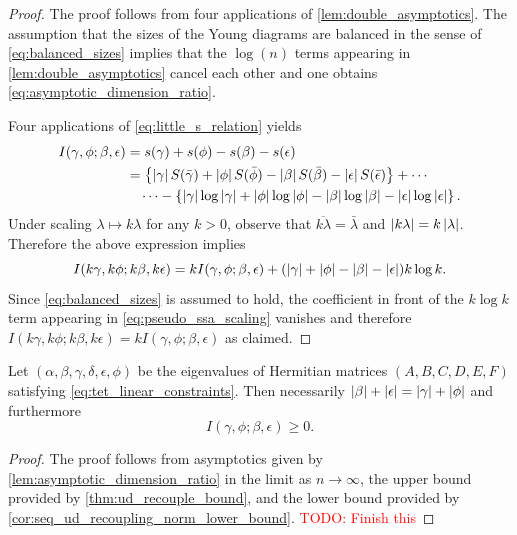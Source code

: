 \documentclass[notitlepage, 10pt]{article}
\begin{document}
\begin{proof}
    The proof follows from four applications of \cref{lem:double_asymptotics}.
    The assumption that the sizes of the Young diagrams are balanced in the sense of \cref{eq:balanced_sizes} implies that the $\log(n)$ terms appearing in \cref{lem:double_asymptotics} cancel each other and one obtains \cref{eq:asymptotic_dimension_ratio}.
    
    Four applications of \cref{eq:little_s_relation} yields
    \begin{align}
        \begin{split}
            I(\gamma,\phi;\beta,\epsilon)
            &= s(\gamma) + s(\phi) - s(\beta) - s(\epsilon) \\
            &= \left\{\left|\gamma\right|S(\bar \gamma) + \left|\phi\right| S(\bar \phi) - \left|\beta\right| S(\bar \beta) - \left|\epsilon\right| S(\bar \epsilon)\right\} + \cdots \\
            &\quad\cdots- \left\{\left|\gamma\right|\log \left|\gamma\right| + \left|\phi\right|\log \left|\phi\right| - \left|\beta\right|\log \left|\beta\right| - \left|\epsilon\right|\log \left|\epsilon\right|\right\}.
        \end{split}
    \end{align}
    Under scaling $\lambda \mapsto k \lambda$ for any $k>0$, observe that $\overline{k\lambda} = \bar \lambda$ and $\left|k\lambda\right| = k \left|\lambda\right|$.
    Therefore the above expression implies
    \begin{equation}
        \label{eq:pseudo_ssa_scaling}
        I(k\gamma,k\phi;k\beta,k\epsilon) = kI(\gamma,\phi;\beta,\epsilon) + (\left|\gamma\right|+\left|\phi\right|-\left|\beta\right|-\left|\epsilon\right|) k\log k.
    \end{equation}
    Since \cref{eq:balanced_sizes} is assumed to hold, the coefficient in front of the $k\log k$ term appearing in \cref{eq:pseudo_ssa_scaling} vanishes and therefore $I(k\gamma,k\phi;k\beta,k\epsilon) = k I(\gamma,\phi;\beta,\epsilon)$ as claimed.
\end{proof}

\begin{thm}
    Let $(\alpha,\beta,\gamma,\delta,\epsilon,\phi)$ be the eigenvalues of Hermitian matrices $(A,B,C,D,E,F)$ satisfying \cref{eq:tet_linear_constraints}.
    Then necessarily $\left|\beta\right|+\left|\epsilon\right| = \left|\gamma\right|+\left|\phi\right|$ and furthermore
    \begin{equation}
        I(\gamma, \phi; \beta, \epsilon) \geq 0.
    \end{equation} 
\end{thm}
\begin{proof}
    The proof follows from asymptotics given by \cref{lem:asymptotic_dimension_ratio} in the limit as $n \to \infty$, the upper bound provided by \cref{thm:ud_recouple_bound}, and the lower bound provided by \cref{cor:seq_ud_recoupling_norm_lower_bound}.
    \textcolor{red}{TODO: Finish this}
\end{proof}
\end{document}
